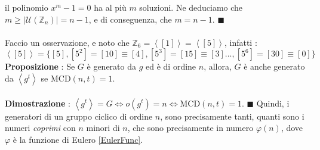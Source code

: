 \documentclass[12pt, letterpaper]{article}
\newcommand{\Z}{{\mathbb Z}}
\newcommand{\MCD}{{\text{MCD}}}
\begin{document}
il polinomio \(x^m-1=0\) ha al più \(m\) soluzioni. Ne deduciamo che \(m\ge |\mathcal{U}(\Z_n)|=n-1\), e di 
conseguenza, che \(m=n-1\). \(\blacksquare\)\\\hphantom{}
\\Faccio un osservazione, e noto che \(\Z_6=\left\langle [1]\right\rangle=\left\langle [5]\right\rangle\), infatti : \begin{equation}
    \left\langle [5]\right\rangle=\{[5],[5^2]=[10]\equiv[4],[5^3]=[15]\equiv[3]...,[5^6]=[30]\equiv[0]\}
\end{equation}
\textbf{Proposizione} : Se \(G\) è generato da \(g\) ed è di ordine \(n\), allora, \(G\) è anche generato da 
\(\left\langle g^t\right\rangle\) se \(\MCD(n,t)=1\).\\\hphantom{}\\
\textbf{Dimostrazione} : \(\left\langle g^t\right\rangle=G\iff o(g^t)=n\iff \MCD(n,t)=1\). \(\blacksquare\)
Quindi, i generatori di un gruppo ciclico di ordine \(n\), sono precisamente tanti, quanti sono i numeri \textit{coprimi}
con \(n\) minori di \(n\), che sono precisamente in numero \(\varphi(n)\), dove \(\varphi\) è la funzione di Eulero \ref{EulerFunc}.
\end{document}
